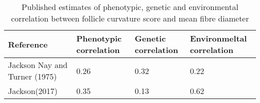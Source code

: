 %

\begin{table}[htp]
\centering
\caption{Published estimates of phenotypic, genetic and environmental correlation between follicle curvature score and mean fibre diameter}
\label{tab:fcd}
\vspace{0.1in}
\begin{tabular}{|p{2.0in}|p{1.0in}|p{1.0in}|p{1.0in}|}  \hline
 Reference  & Phenotypic correlation  &  Genetic correlation & Environmeltal correlation  \\ 
\hline 
Jackson Nay and Turner (1975)~\cite{jackson-1975} & 0.26 & 0.32 & 0.22 \\
Jackson(2017)~\cite{jackson-2017a}    & 0.35 & 0.13 & 0.62 \\
\hline

\end{tabular}
\end{table}

%
